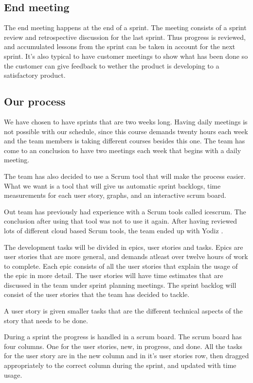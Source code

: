 \subsection{End meeting}
The end meeting happens at the end of a sprint. The meeting consists of a sprint review and retrospective discussion for the last sprint.
Thus progress is reviewed, and accumulated lessons from the sprint can be taken in account for the next sprint.
It's also typical to have customer meetings to show what has been done so the customer can give feedback to wether the product is developing to a satisfactory product.

\subsection{Our process}
We have chosen to have sprints that are two weeks long. Having daily meetings is not possible with our schedule,
since this course demands twenty hours each week and the team members is taking different courses besides this one.
The team has come to an conclusion to have two meetings each week that begins with a daily meeting.

The team has also decided to use a Scrum tool that will make the process easier.
What we want is a tool that will give us automatic sprint backlogs, time measurements for each user story, graphs, and an interactive scrum board.

Out team has previously had experience with a Scrum tools called icescrum. The conclusion after using that tool was not to use it again.
After having reviewed lots of different cloud based Scrum tools, the team ended up with Yodiz \cite{Yodiz}.

The development tasks will be divided in epics, user stories and tasks. Epics are user stories that are more general, and demands  atleast over twelve hours of work to complete. Each epic consists
of all the user stories that explain the usage of the epic in more detail. The user stories will have time estimates that are discussed in the team under sprint planning meetings.
The sprint backlog will consist of the user stories that the team has decided to tackle.

A user story is given smaller tasks that are the different technical aspects of the story that needs to be done.

During a sprint the progress is handled in a scrum board. The scrum board has four columns. One for the user stories, new, in progress, and done.
All the tasks for the user story are in the new column and in it's user stories row, then dragged appropriately to the correct column during the sprint, and updated with time usage.
